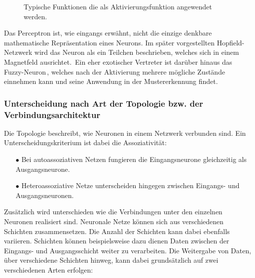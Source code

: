 \begin{figure}[!htb]
    \centering
    
    
    \caption[Typische Aktivierungsfunktionen]{Typische Funktionen die als Aktivierungsfunktion angewendet werden.\,\protect\footnotemark{}}
    \label{fig:funktion}
\end{figure}
\addtocounter{footnote}{-1}     %
\addtocounter{Hfootnote}{-1}    %
\wrapfigfoot{}

Das Perceptron ist, wie eingangs erwähnt, nicht die einzige denkbare mathematische Repräsentation eines Neurons. Im später vorgestellten Hopfield-Netzwerk wird das Neuron als ein Teilchen beschrieben, welches sich in einem Magnetfeld ausrichtet.\, Ein eher exotischer Vertreter ist darüber hinaus das Fuzzy-Neuron\,, welches nach der Aktivierung mehrere mögliche Zustände einnehmen kann und seine Anwendung in der Mustererkennung findet. 

\newpage

\subsubsection{Unterscheidung nach Art der Topologie bzw. der Verbindungsarchitektur}

Die Topologie beschreibt, wie Neuronen in einem Netzwerk verbunden sind. Ein Unterscheidungskriterium ist dabei die Assoziativität:
\begin{itemize}
\item[\textbf{$\bullet$}] Bei autoassoziativen Netzen fungieren die Eingangsneurone gleichzeitig als Ausgangsneurone.

\item[\textbf{$\bullet$}] Heteroassoziative Netze unterscheiden hingegen zwischen Eingangs- und Ausgangsneuronen.
\end{itemize}

Zusätzlich wird unterschieden wie die Verbindungen unter den einzelnen Neuronen realisiert sind. Neuronale Netze können sich aus verschiedenen Schichten zusammensetzen. Die Anzahl der Schichten kann dabei ebenfalls variieren. Schichten können beispielsweise dazu dienen Daten zwischen der Eingangs- und Ausgangsschicht weiter zu verarbeiten. Die Weitergabe von Daten, über verschiedene Schichten hinweg, kann dabei grundsätzlich auf zwei verschiedenen Arten erfolgen:\,


